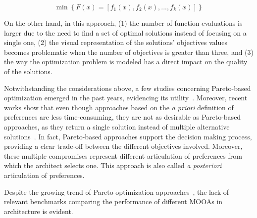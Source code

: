 	\begin{equation} \label{eq:pareto-based}
	\min \left\lbrace F(x) = \left[f_1(x), f_2(x), ..., f_k(x)\right] \right\rbrace
	\end{equation}
	
	On the other hand, in this approach, (1) the number of function evaluations is larger due to the need to find a set of optimal solutions instead of focusing on a single one, (2) the visual representation of the solutions’ objectives values becomes problematic when the number of objectives is greater than three, and (3) the way the optimization problem is modeled has a direct impact on the quality of the solutions.
	
	Notwithstanding the considerations above, a few studies concerning Pareto-based optimization emerged in the past years, evidencing its utility~\cite{Evins2013,Hamdy2016}. Moreover, recent works show that even though
	approaches based on the \textit{a priori} definition of preferences are less time-consuming, they are not as desirable as Pareto-based approaches, as they return a single solution instead of multiple alternative solutions~\cite{Attia2013,Hamdy2016,Cichocka2017SURVEY}. In fact, Pareto-based approaches support the decision making process, providing a clear trade-off between the different objectives involved. Moreover, these multiple compromises represent different articulation of preferences from which the architect selects one. This approach is also called \textit{a posteriori} articulation of preferences.
	
	Despite the growing trend of Pareto optimization approaches~\cite{Evins2013, Hamdy2016}, the lack of relevant benchmarks comparing the performance of different \acp{MOOA} in architecture is evident. 
	
